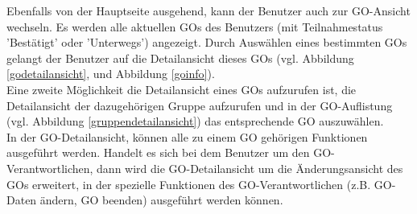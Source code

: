\documentclass[parskip=full]{scrartcl}
\begin{document}
Ebenfalls von der Hauptseite ausgehend, kann der Benutzer auch zur GO-Ansicht wechseln. Es werden alle aktuellen GOs des Benutzers (mit Teilnahmestatus 'Bestätigt' oder 'Unterwegs') angezeigt. Durch Auswählen eines bestimmten GOs gelangt der Benutzer auf die Detailansicht dieses GOs (vgl. Abbildung \ref{godetailansicht}, und Abbildung \ref{goinfo}).\\
Eine zweite Möglichkeit die Detailansicht eines GOs aufzurufen ist, die Detailansicht der dazugehörigen Gruppe aufzurufen und in der GO-Auflistung (vgl. Abbildung \ref{gruppendetailansicht}) das entsprechende GO auszuwählen. \\

In der GO-Detailansicht, können alle zu einem GO gehörigen Funktionen ausgeführt werden. Handelt es sich bei dem Benutzer um den GO-Verantwortlichen, dann wird die GO-Detailansicht um die Änderungsansicht des GOs erweitert, in der spezielle Funktionen des GO-Verantwortlichen (z.B. GO-Daten ändern, GO beenden) ausgeführt werden können.
\end{document}
